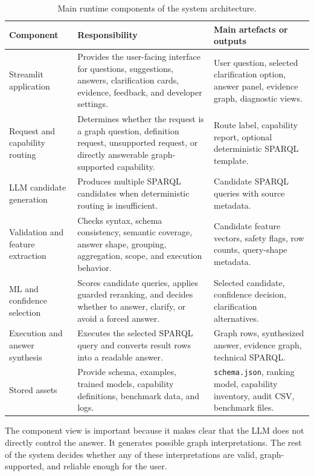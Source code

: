 \documentclass[
  12pt,
  english,
  oneside]{report}
\begin{document}
\begin{table}[htbp]
\centering
\caption{Main runtime components of the system architecture.}
\label{tab:runtime-components}
\small
\begin{tabularx}{\textwidth}{
>{\raggedright\arraybackslash}p{3.1cm}
>{\raggedright\arraybackslash}p{5.5cm}
>{\raggedright\arraybackslash}X
}
\toprule
\textbf{Component} & \textbf{Responsibility} & \textbf{Main artefacts or outputs} \\
\midrule
Streamlit application & Provides the user-facing interface for questions, suggestions, answers, clarification cards, evidence, feedback, and developer settings. & User question, selected clarification option, answer panel, evidence graph, diagnostic views. \\
Request and capability routing & Determines whether the request is a graph question, definition request, unsupported request, or directly answerable graph-supported capability. & Route label, capability report, optional deterministic SPARQL template. \\
LLM candidate generation & Produces multiple SPARQL candidates when deterministic routing is insufficient. & Candidate SPARQL queries with source metadata. \\
Validation and feature extraction & Checks syntax, schema consistency, semantic coverage, answer shape, grouping, aggregation, scope, and execution behavior. & Candidate feature vectors, safety flags, row counts, query-shape metadata. \\
ML and confidence selection & Scores candidate queries, applies guarded reranking, and decides whether to answer, clarify, or avoid a forced answer. & Selected candidate, confidence decision, clarification alternatives. \\
Execution and answer synthesis & Executes the selected SPARQL query and converts result rows into a readable answer. & Graph rows, synthesized answer, evidence graph, technical SPARQL. \\
Stored assets & Provide schema, examples, trained models, capability definitions, benchmark data, and logs. & \texttt{schema.json}, ranking model, capability inventory, audit CSV, benchmark files. \\
\bottomrule
\end{tabularx}
\end{table}

The component view is important because it makes clear that the LLM does not directly control the answer. It generates possible graph interpretations. The rest of the system decides whether any of these interpretations are valid, graph-supported, and reliable enough for the user.
\end{document}
